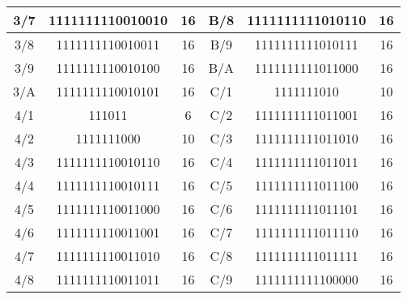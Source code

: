 \begin{table}[!ht]
\begin{tabular}{|c|c|c|c|c|c|}
3/7                                                        & 1111111110010010 & 16      & B/8                                                        & 1111111111010110 & 16      \\ \hline
3/8                                                        & 1111111110010011 & 16      & B/9                                                        & 1111111111010111 & 16      \\ \hline
3/9                                                        & 1111111110010100 & 16      & B/A                                                        & 1111111111011000 & 16      \\ \hline
3/A                                                        & 1111111110010101 & 16      & C/1                                                        & 1111111010       & 10      \\ \hline
4/1                                                        & 111011           & 6       & C/2                                                        & 1111111111011001 & 16      \\ \hline
4/2                                                        & 1111111000       & 10      & C/3                                                        & 1111111111011010 & 16      \\ \hline
4/3                                                        & 1111111110010110 & 16      & C/4                                                        & 1111111111011011 & 16      \\ \hline
4/4                                                        & 1111111110010111 & 16      & C/5                                                        & 1111111111011100 & 16      \\ \hline
4/5                                                        & 1111111110011000 & 16      & C/6                                                        & 1111111111011101 & 16      \\ \hline
4/6                                                        & 1111111110011001 & 16      & C/7                                                        & 1111111111011110 & 16      \\ \hline
4/7                                                        & 1111111110011010 & 16      & C/8                                                        & 1111111111011111 & 16      \\ \hline
4/8                                                        & 1111111110011011 & 16      & C/9                                                        & 1111111111100000 & 16      \\ \hline

\end{tabular}
\end{table}
